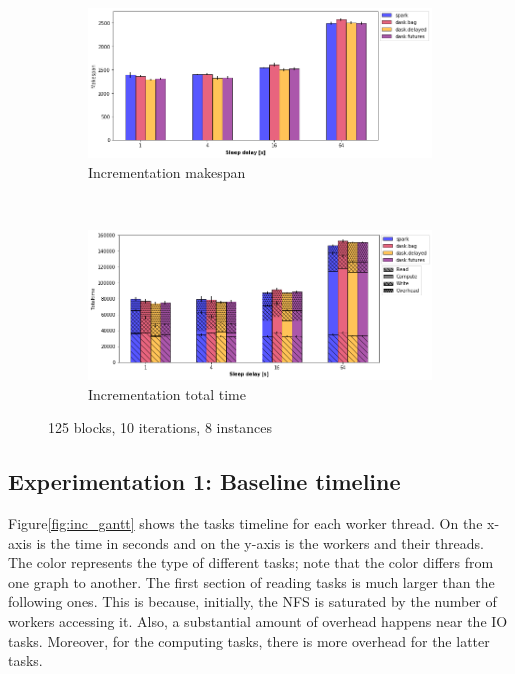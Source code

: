\documentclass[conference]{IEEEtran}
\begin{document}
\begin{figure}[!t]
    \centering
    \begin{subfigure}[b]{\columnwidth}
        \includegraphics[clip,width=\columnwidth]{images/inc_sleep.png}%
        \caption{Incrementation makespan}\label{fig:inc_ms_sleep}
    \end{subfigure}
    \\
    \begin{subfigure}[b]{\columnwidth}
        \includegraphics[clip,width=\columnwidth]{images/inc_idle_sleep.png}%
        \caption{Incrementation total time}\label{fig:inc_tt_sleep}
    \end{subfigure}
    \caption{125 blocks, 10 iterations, 8 instances}
\end{figure}

\subsection{Experimentation 1: Baseline timeline}
Figure\ref{fig:inc_gantt} shows the tasks timeline for each worker thread. On the
x-axis is the time in seconds and on the y-axis is the workers and their threads. The
color represents the type of different tasks; note that the color differs from one
graph to another. The first section of reading tasks is much larger than the
following ones. This is because, initially, the NFS is saturated by the number of
workers accessing it. Also, a substantial amount of overhead happens near the IO
tasks. Moreover, for the computing tasks, there is more overhead for the latter tasks.
\end{document}
